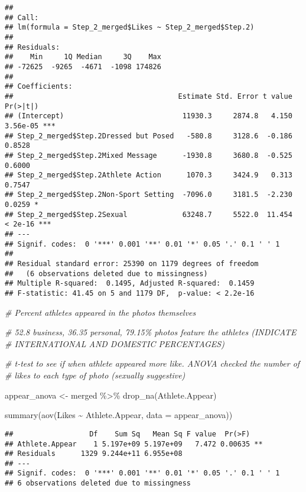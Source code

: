 \documentclass[
]{article}
\newenvironment{Shaded}{\begin{snugshade}}{\end{snugshade}}
\newcommand{\AttributeTok}[1]{\textcolor[rgb]{0.77,0.63,0.00}{#1}}
\newcommand{\CommentTok}[1]{\textcolor[rgb]{0.56,0.35,0.01}{\textit{#1}}}
\newcommand{\FunctionTok}[1]{\textcolor[rgb]{0.00,0.00,0.00}{#1}}
\newcommand{\NormalTok}[1]{#1}
\newcommand{\OtherTok}[1]{\textcolor[rgb]{0.56,0.35,0.01}{#1}}
\newcommand{\SpecialCharTok}[1]{\textcolor[rgb]{0.00,0.00,0.00}{#1}}
\begin{document}
\begin{verbatim}
## 
## Call:
## lm(formula = Step_2_merged$Likes ~ Step_2_merged$Step.2)
## 
## Residuals:
##    Min     1Q Median     3Q    Max 
## -72625  -9265  -4671  -1098 174826 
## 
## Coefficients:
##                                       Estimate Std. Error t value Pr(>|t|)    
## (Intercept)                            11930.3     2874.8   4.150 3.56e-05 ***
## Step_2_merged$Step.2Dressed but Posed   -580.8     3128.6  -0.186   0.8528    
## Step_2_merged$Step.2Mixed Message      -1930.8     3680.8  -0.525   0.6000    
## Step_2_merged$Step.2Athlete Action      1070.3     3424.9   0.313   0.7547    
## Step_2_merged$Step.2Non-Sport Setting  -7096.0     3181.5  -2.230   0.0259 *  
## Step_2_merged$Step.2Sexual             63248.7     5522.0  11.454  < 2e-16 ***
## ---
## Signif. codes:  0 '***' 0.001 '**' 0.01 '*' 0.05 '.' 0.1 ' ' 1
## 
## Residual standard error: 25390 on 1179 degrees of freedom
##   (6 observations deleted due to missingness)
## Multiple R-squared:  0.1495, Adjusted R-squared:  0.1459 
## F-statistic: 41.45 on 5 and 1179 DF,  p-value: < 2.2e-16
\end{verbatim}

\begin{Shaded}
\begin{Highlighting}[]
\CommentTok{\# Percent athletes appeared in the photos themselves}

\CommentTok{\# 52.8 business, 36.35 personal, 79.15\% photos feature the athletes (INDICATE}
\CommentTok{\# INTERNATIONAL AND DOMESTIC PERCENTAGES)}

\CommentTok{\# t{-}test to see if when athlete appeared more like. ANOVA checked the number of }
\CommentTok{\# likes to each type of photo (sexually suggestive)}

\NormalTok{appear\_anova }\OtherTok{\textless{}{-}}\NormalTok{ merged }\SpecialCharTok{\%\textgreater{}\%}
  \FunctionTok{drop\_na}\NormalTok{(Athlete.Appear)}

\FunctionTok{summary}\NormalTok{(}\FunctionTok{aov}\NormalTok{(Likes }\SpecialCharTok{\textasciitilde{}}\NormalTok{ Athlete.Appear, }\AttributeTok{data =}\NormalTok{ appear\_anova))}
\end{Highlighting}
\end{Shaded}

\begin{verbatim}
##                  Df    Sum Sq   Mean Sq F value  Pr(>F)   
## Athlete.Appear    1 5.197e+09 5.197e+09   7.472 0.00635 **
## Residuals      1329 9.244e+11 6.955e+08                   
## ---
## Signif. codes:  0 '***' 0.001 '**' 0.01 '*' 0.05 '.' 0.1 ' ' 1
## 6 observations deleted due to missingness
\end{verbatim}
\end{document}
